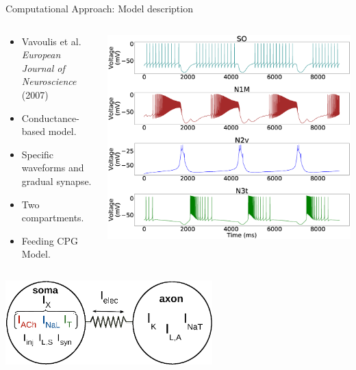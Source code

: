 \documentclass[aspectratio=43]{beamer}
\begin{document}
\begin{frame}{Computational Approach: Model description}
	\begin{columns}
		\begin{column}{0.5\textwidth}
			\begin{itemize}
				\item<1->Vavoulis et al. \textit{European Journal of Neuroscience} (2007)
				\item<1->Conductance-based model.
				\item<1->Specific waveforms and gradual synapse.
				\item<1->Two compartments.
				\item<1->Feeding CPG Model.
			\end{itemize}
		\end{column}
		\begin{column}{0.5\textwidth}
			\includegraphics[width=\textwidth]{methods/invariants-model/figure2.eps}
		\end{column}
	\end{columns}
		\vspace{4pt}
		\centering
		\includegraphics[width=0.6\textwidth]{methods/invariants-model/figure1a.eps}
\end{frame}
\end{document}
